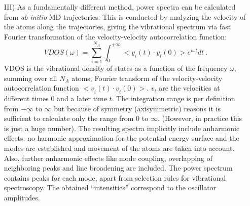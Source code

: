 \documentclass[11pt,DIV=13,BCOR=5mm,a4paper,headinclude]{scrbook}
\renewcommand{\vec}[1]{\underline{#1}}
\begin{document}
\begin{itemize}
\item[III)] As a fundamentally different method, power spectra can be calculated from \textit{ab initio} MD trajectories\cite{VAC}.
This is conducted by analyzing the velocity of the atoms along the trajectories, giving the vibrational spectrum via fast Fourier transformation of the velocity-velocity autocorrelation function:
\begin{equation}
 VDOS(\omega)=\sum_{i=1}^{N_A}\int_{0}^{+\infty}<\vec{v}_i(t)\cdot \vec{v}_i(0)>e^{i\omega t}dt ~.
\end{equation}
VDOS is the vibrational density of states as a function of the frequency $\omega$, summing over all $N_A$ atoms, Fourier transform of the velocity-velocity autocorrelation function $<\vec{v}_i(t)\cdot \vec{v}_i(0)>$.
$v_i$ are the velocities at different times $0$ and a later time $t$.
The integration range is per definition from $-\infty$ to $\infty$ but because of symmetry (axisymmetric) reasons it is sufficient to calculate only the range from $0$ to $\infty$. (However, in practice this is just a huge number).
The resulting spectra implicitly include anharmonic effects: no harmonic approximation for the potential energy surface and the modes are established and movement of the atoms are taken into account.
Also, further anharmonic effects like mode coupling, overlapping of neighboring peaks and line broadening are included\cite{hornicek2007,hudecova2012}.
The power spectrum contains peaks for each mode, apart from selection rules for vibrational spectroscopy.
The obtained ``intensities'' correspond to the oscillator amplitudes.
\end{itemize}
\end{document}
